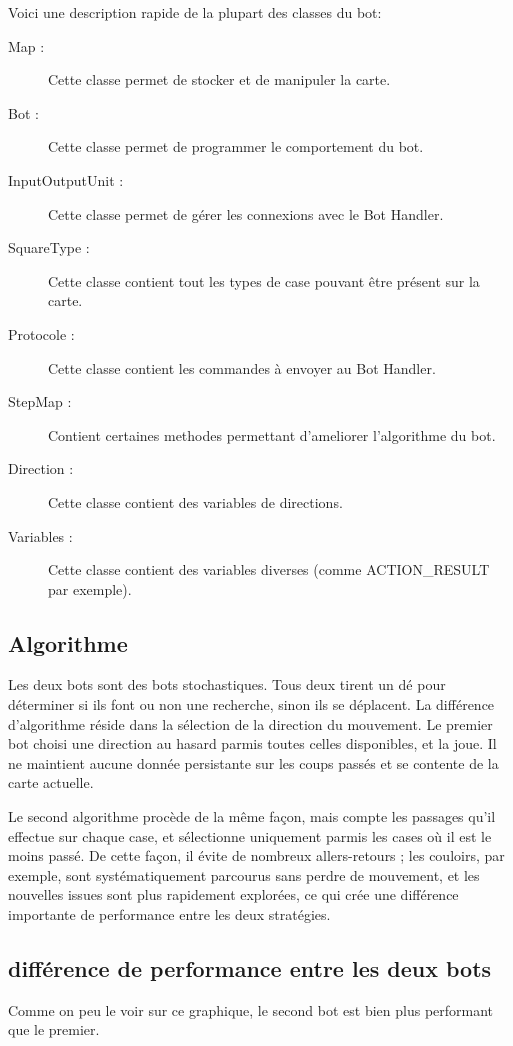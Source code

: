 Voici une description rapide de la plupart des classes du bot:

\begin{description}
\item[Map :] Cette classe permet de stocker et de manipuler la carte.
\item[Bot :] Cette classe permet de programmer le comportement du bot.
\item[InputOutputUnit :] Cette classe permet de gérer les connexions avec le Bot Handler.
\item[SquareType :] Cette classe contient tout les types de case pouvant être présent sur la carte.
\item[Protocole :] Cette classe contient les commandes à envoyer au Bot Handler.
\item[StepMap :] Contient certaines methodes permettant d'ameliorer l'algorithme du bot.
\item[Direction :] Cette classe contient des variables de directions.
\item[Variables :] Cette classe contient des variables diverses (comme ACTION\_RESULT par exemple).
\end{description} 

\subsection{Algorithme}

Les deux bots sont des bots stochastiques. Tous deux tirent un dé pour déterminer si ils font ou non une recherche, sinon ils se déplacent. La différence d'algorithme réside dans la sélection de la direction du mouvement. Le premier bot choisi une direction au hasard parmis toutes celles disponibles, et la joue. Il ne maintient aucune donnée persistante sur les coups passés et se contente de la carte actuelle.

Le second algorithme procède de la même façon, mais compte les passages qu'il effectue sur chaque case, et sélectionne uniquement parmis les cases où il est le moins passé. De cette façon, il évite de nombreux allers-retours ; les couloirs, par exemple, sont systématiquement parcourus sans perdre de mouvement, et les nouvelles issues sont plus rapidement explorées, ce qui crée une différence importante de performance entre les deux stratégies. 

\subsection{différence de performance entre les deux bots}


Comme on peu le voir sur ce graphique, le second bot est bien plus performant que le premier.
